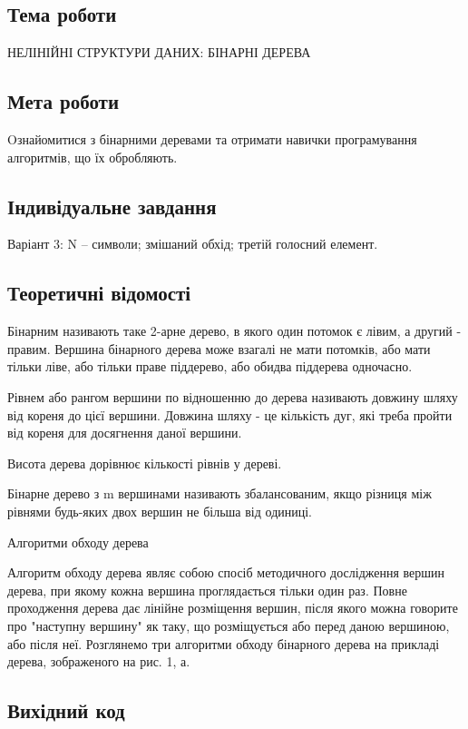 \documentclass[12pt]{extarticle}
\begin{document}
\subsection*{Тема роботи} 
НЕЛІНІЙНІ СТРУКТУРИ ДАНИХ: БІНАРНІ ДЕРЕВА

\subsection*{Мета роботи} Oзнайомитися з бінарними деревами та отримати навички програмування алгоритмів, що їх обробляють.


\subsection*{Індивідуальне завдання}
Варіант 3: N  -- символи; змішаний обхід; третій голосний елемент. 



\subsection*{Теоретичні відомості}
Бінарним називають таке 2-арне дерево, в якого один потомок є лівим, а другий - правим. Вершина бінарного дерева може взагалі не мати потомків, або мати тільки ліве, або тільки праве піддерево, або обидва піддерева одночасно.

Рівнем або рангом вершини по відношенню до дерева називають довжину шляху від кореня до цієї вершини. Довжина шляху - це кількість дуг, які треба пройти від кореня для досягнення даної вершини.

Висота дерева дорівнює кількості рівнів у дереві.

Бінарне дерево з m вершинами називають збалансованим, якщо різниця між рівнями будь-яких двох вершин не більша від одиниці.

Алгоритми обходу дерева

Алгоритм обходу дерева являє собою спосіб методичного дослідження вершин дерева, при якому кожна вершина проглядається тільки один раз. Повне проходження дерева дає лінійне розміщення вершин, після якого можна говорите про "наступну вершину" як таку, що розміщується або перед даною вершиною, або після неї. Розглянемо три алгоритми обходу бінарного дерева на прикладі дерева, зображеного на рис. 1, а.


\subsection*{Вихідний код}
\end{document}
